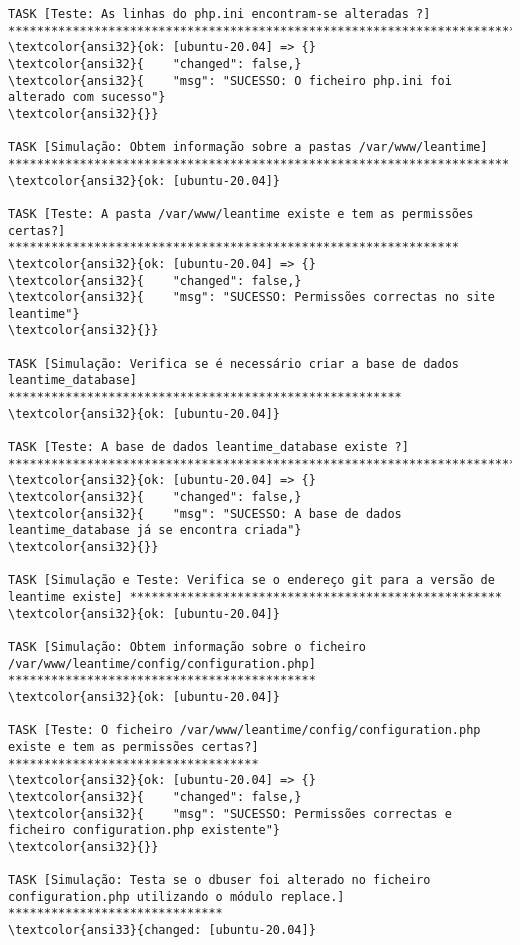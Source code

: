 \documentclass{scrartcl}
\begin{document}
\begin{Verbatim}
TASK [Teste: As linhas do php.ini encontram-se alteradas ?] ******************************************************************************
\textcolor{ansi32}{ok: [ubuntu-20.04] => {}
\textcolor{ansi32}{    "changed": false,}
\textcolor{ansi32}{    "msg": "SUCESSO: O ficheiro php.ini foi alterado com sucesso"}
\textcolor{ansi32}{}}

TASK [Simulação: Obtem informação sobre a pastas /var/www/leantime] **********************************************************************
\textcolor{ansi32}{ok: [ubuntu-20.04]}

TASK [Teste: A pasta /var/www/leantime existe e tem as permissões certas?] ***************************************************************
\textcolor{ansi32}{ok: [ubuntu-20.04] => {}
\textcolor{ansi32}{    "changed": false,}
\textcolor{ansi32}{    "msg": "SUCESSO: Permissões correctas no site leantime"}
\textcolor{ansi32}{}}

TASK [Simulação: Verifica se é necessário criar a base de dados leantime_database] *******************************************************
\textcolor{ansi32}{ok: [ubuntu-20.04]}

TASK [Teste: A base de dados leantime_database existe ?] *********************************************************************************
\textcolor{ansi32}{ok: [ubuntu-20.04] => {}
\textcolor{ansi32}{    "changed": false,}
\textcolor{ansi32}{    "msg": "SUCESSO: A base de dados leantime_database já se encontra criada"}
\textcolor{ansi32}{}}

TASK [Simulação e Teste: Verifica se o endereço git para a versão de leantime existe] ****************************************************
\textcolor{ansi32}{ok: [ubuntu-20.04]}

TASK [Simulação: Obtem informação sobre o ficheiro /var/www/leantime/config/configuration.php] *******************************************
\textcolor{ansi32}{ok: [ubuntu-20.04]}

TASK [Teste: O ficheiro /var/www/leantime/config/configuration.php existe e tem as permissões certas?] ***********************************
\textcolor{ansi32}{ok: [ubuntu-20.04] => {}
\textcolor{ansi32}{    "changed": false,}
\textcolor{ansi32}{    "msg": "SUCESSO: Permissões correctas e ficheiro configuration.php existente"}
\textcolor{ansi32}{}}

TASK [Simulação: Testa se o dbuser foi alterado no ficheiro configuration.php utilizando o módulo replace.] ******************************
\textcolor{ansi33}{changed: [ubuntu-20.04]}


\end{Verbatim}
\end{document}
